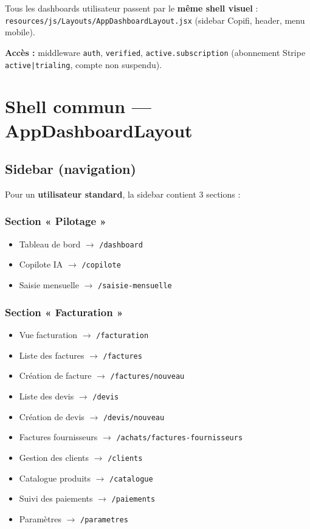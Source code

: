 \documentclass[11pt,a4paper]{report}
\newcommand{\filepath}[1]{\texttt{\small #1}}
\newcommand{\route}[1]{\texttt{\small #1}}
\begin{document}
Tous les dashboards utilisateur passent par le \textbf{même shell visuel} :
\filepath{resources/js/Layouts/AppDashboardLayout.jsx} (sidebar Copifi, header, menu mobile).

\textbf{Accès :} middleware \texttt{auth}, \texttt{verified}, \texttt{active.subscription} (abonnement Stripe \texttt{active|trialing}, compte non suspendu).

\chapter{Shell commun — AppDashboardLayout}

\section{Sidebar (navigation)}

Pour un \textbf{utilisateur standard}, la sidebar contient 3 sections :

\subsection{Section « Pilotage »}
\begin{itemize}[leftmargin=1.5em]
    \item Tableau de bord $\rightarrow$ \route{/dashboard}
    \item Copilote IA $\rightarrow$ \route{/copilote}
    \item Saisie mensuelle $\rightarrow$ \route{/saisie-mensuelle}
\end{itemize}

\subsection{Section « Facturation »}
\begin{itemize}[leftmargin=1.5em]
    \item Vue facturation $\rightarrow$ \route{/facturation}
    \item Liste des factures $\rightarrow$ \route{/factures}
    \item Création de facture $\rightarrow$ \route{/factures/nouveau}
    \item Liste des devis $\rightarrow$ \route{/devis}
    \item Création de devis $\rightarrow$ \route{/devis/nouveau}
    \item Factures fournisseurs $\rightarrow$ \route{/achats/factures-fournisseurs}
    \item Gestion des clients $\rightarrow$ \route{/clients}
    \item Catalogue produits $\rightarrow$ \route{/catalogue}
    \item Suivi des paiements $\rightarrow$ \route{/paiements}
    \item Paramètres $\rightarrow$ \route{/parametres}
\end{itemize}
\end{document}
